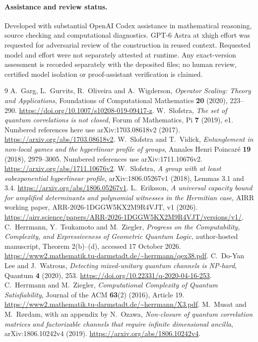 \documentclass[11pt]{article}
\begin{document}
\paragraph{Assistance and review status.}
Developed with substantial OpenAI Codex assistance in mathematical reasoning, source checking and computational diagnostics. GPT-6 Astra at xhigh effort was requested for adversarial review of the construction in reused context. Requested model and effort were not separately attested at runtime. Any exact-version assessment is recorded separately with the deposited files; no human review, certified model isolation or proof-assistant verification is claimed.

\begin{thebibliography}{9}
A.~Garg, L.~Gurvits, R.~Oliveira and A.~Wigderson,
\emph{Operator Scaling: Theory and Applications},
Foundations of Computational Mathematics \textbf{20} (2020), 223--290.
\url{https://doi.org/10.1007/s10208-019-09417-z}.
W.~Slofstra, \emph{The set of quantum correlations is not closed},
Forum of Mathematics, Pi \textbf{7} (2019), e1.
Numbered references here use arXiv:1703.08618v2 (2017).
\url{https://arxiv.org/abs/1703.08618v2}.
W.~Slofstra and T.~Vidick,
\emph{Entanglement in non-local games and the hyperlinear profile of groups},
Annales Henri Poincar\'e \textbf{19} (2018), 2979--3005.
Numbered references use arXiv:1711.10676v2.
\url{https://arxiv.org/abs/1711.10676v2}.
W.~Slofstra,
\emph{A group with at least subexponential hyperlinear profile},
arXiv:1806.05267v1 (2018), Lemmas 3.1 and 3.4.
\url{https://arxiv.org/abs/1806.05267v1}.
L.~Eriksson,
\emph{A universal capacity bound for amplified determinants and polynomial witnesses in the Hermitian case},
AIRR working paper, ARR-2026-1DGGW5KX2M9R4VJT, v1 (2026).
\url{https://airr.science/papers/ARR-2026-1DGGW5KX2M9R4VJT/versions/v1/}.
C.~Herrmann, Y.~Tsukamoto and M.~Ziegler,
\emph{Progress on the Computability, Complexity, and Expressiveness of Geometric Quantum Logic},
author-hosted manuscript, Theorem 2(b)--(d), accessed 17 October 2026.
\url{https://www2.mathematik.tu-darmstadt.de/~herrmann/qex38.pdf}.
C.~Do-Yan Lee and J.~Watrous,
\emph{Detecting mixed-unitary quantum channels is NP-hard},
Quantum \textbf{4} (2020), 253.
\url{https://doi.org/10.22331/q-2020-04-16-253}.
C.~Herrmann and M.~Ziegler,
\emph{Computational Complexity of Quantum Satisfiability},
Journal of the ACM \textbf{63}(2) (2016), Article 19.
\url{https://www2.mathematik.tu-darmstadt.de/~herrmann/X3.pdf}.
M.~Musat and M.~R\o rdam, with an appendix by N.~Ozawa,
\emph{Non-closure of quantum correlation matrices and factorizable channels that require infinite dimensional ancilla},
arXiv:1806.10242v4 (2019).
\url{https://arxiv.org/abs/1806.10242v4}.
\end{thebibliography}
\end{document}
